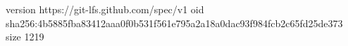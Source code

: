 version https://git-lfs.github.com/spec/v1
oid sha256:4b5885fba83412aaa0f0b531f561e795a2a18a0dac93f984fcb2c65fd25de373
size 1219
